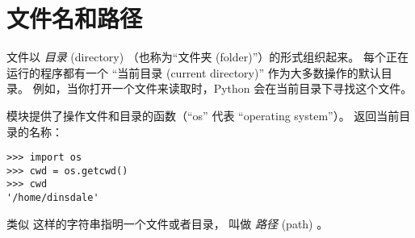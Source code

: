 {{{{{{{%
\section{文件名和路径}
\label{paths}
  
  


文件以 {\em 目录} (directory) （也称为``文件夹 (folder)''）的形式组织起来。
每个正在运行的程序都有一个 ``当前目录 (current directory)'' 作为大多数操作的默认目录。
例如，当你打开一个文件来读取时，Python 会在当前目录下寻找这个文件。

  


 模块提供了操作文件和目录的函数（``os'' 代表 ``operating system''）。  返回当前目录的名称：

  

\begin{lstlisting}
>>> import os
>>> cwd = os.getcwd()
>>> cwd
'/home/dinsdale'
\end{lstlisting}

%

  


类似  这样的字符串指明一个文件或者目录， 叫做 {\em 路径} (path) 。

}}}}}}}
